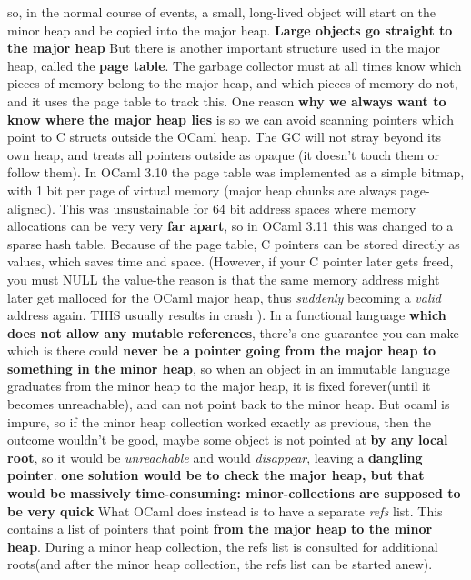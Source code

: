 \begin{enumerate}
\begin{enumerate}[(a)]
    so, in the normal course of events, a small, long-lived object will start on the
    minor heap and be copied into the major heap. \textbf{ Large objects go straight to
      the major heap}
    But there is another important structure used in the major heap, called the
    \textbf{ page table}. The garbage collector must at all times know which pieces of
    memory belong to the major heap, and which pieces of memory do not, and it uses
    the page table to track this.
    One reason \textbf{ why we always want to know where the major heap lies }
    is so we can avoid
    scanning pointers which point to C structs outside the OCaml heap.
    The GC will not stray beyond its own heap, and treats all pointers outside as
    opaque (it doesn't touch them or follow them).
    In OCaml 3.10 the page table was implemented as a simple bitmap, with 1 bit per page
    of virtual memory (major heap chunks are always page-aligned). This was
    unsustainable for 64 bit address spaces where memory allocations can be very very
    \textbf{ far apart}, so in OCaml 3.11 this was changed to a sparse hash table.
    Because of the page table, C pointers can be stored directly as values, which
    saves time and space. (However, if your C pointer later gets freed, you must NULL
    the value-the reason is that the same memory address might later get malloced
    for the OCaml major heap, thus \textit{suddenly} becoming a \textit{valid} address again.
    THIS usually results in crash ).
    In a functional language \textbf{ which does not allow any mutable references}, there's one
    guarantee you can make which is there could \textbf{ never be a pointer going from the major heap
      to something in the minor heap}, so when an object in an immutable language graduates from the
    minor heap to the major heap, it is fixed forever(until it becomes unreachable), and can not
    point back to the minor heap.
    But ocaml is impure, so if the minor heap collection worked exactly as previous, then the outcome
    wouldn't be good, maybe some object is not pointed at \textbf{ by any local root}, so it would
    be \textit{unreachable} and would \textit{disappear}, leaving a \textbf{ dangling pointer}.
    \textbf{ one solution would be to check the major heap, but that would be massively time-consuming:
      minor-collections are supposed to be very quick }
    What OCaml does instead is to have a separate \textit{refs} list. This contains a list of pointers
    that point \textbf{ from the major heap to the minor heap}. During a minor heap collection, the
    refs list is consulted for additional roots(and after the minor heap collection, the refs list
    can be started anew).


\end{enumerate}
\end{enumerate}
